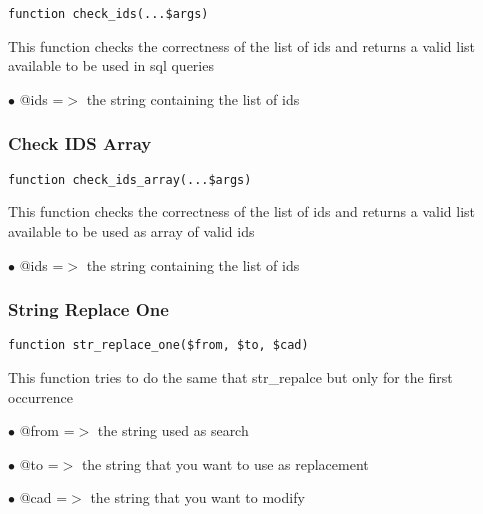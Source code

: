 \documentclass[a4paper]{article}
\begin{document}
\begin{lstlisting}
function check_ids(...$args)
\end{lstlisting}

This function checks the correctness of the list of ids and returns a valid
list available to be used in sql queries

\begin{compactitem}
\item[\color{myblue}$\bullet$] @ids =$>$ the string containing the list of ids
\end{compactitem}

\hypertarget{toc251}{}
\subsubsection{Check IDS Array}

\begin{lstlisting}
function check_ids_array(...$args)
\end{lstlisting}

This function checks the correctness of the list of ids and returns a valid
list available to be used as array of valid ids

\begin{compactitem}
\item[\color{myblue}$\bullet$] @ids =$>$ the string containing the list of ids
\end{compactitem}

\hypertarget{toc252}{}
\subsubsection{String Replace One}

\begin{lstlisting}
function str_replace_one($from, $to, $cad)
\end{lstlisting}

This function tries to do the same that str\_repalce but only for the first
occurrence

\begin{compactitem}
\item[\color{myblue}$\bullet$] @from =$>$ the string used as search
\item[\color{myblue}$\bullet$] @to   =$>$ the string that you want to use as replacement
\item[\color{myblue}$\bullet$] @cad  =$>$ the string that you want to modify
\end{compactitem}
\end{document}
